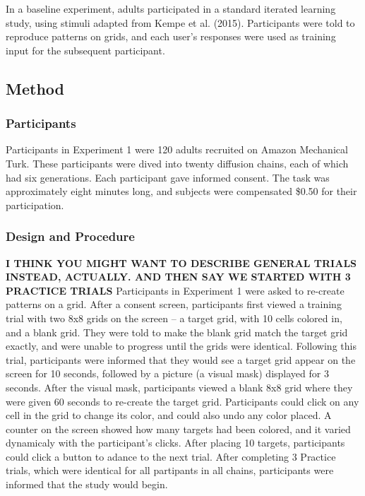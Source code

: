 \documentclass[10pt, letterpaper]{article}
\begin{document}
In a baseline experiment, adults participated in a standard iterated
learning study, using stimuli adapted from Kempe et al. (2015).
Participants were told to reproduce patterns on grids, and each user's
responses were used as training input for the subsequent participant.

\hypertarget{method}{%
\subsection{Method}\label{method}}

\hypertarget{participants}{%
\subsubsection{Participants}\label{participants}}

Participants in Experiment 1 were 120 adults recruited on Amazon
Mechanical Turk. These participants were dived into twenty diffusion
chains, each of which had six generations. Each participant gave
informed consent. The task was approximately eight minutes long, and
subjects were compensated \$0.50 for their participation.

\hypertarget{design-and-procedure}{%
\subsubsection{Design and Procedure}\label{design-and-procedure}}

\textbf{I THINK YOU MIGHT WANT TO DESCRIBE GENERAL TRIALS INSTEAD,
ACTUALLY. AND THEN SAY WE STARTED WITH 3 PRACTICE TRIALS} Participants
in Experiment 1 were asked to re-create patterns on a grid. After a
consent screen, participants first viewed a training trial with two 8x8
grids on the screen -- a target grid, with 10 cells colored in, and a
blank grid. They were told to make the blank grid match the target grid
exactly, and were unable to progress until the grids were identical.
Following this trial, participants were informed that they would see a
target grid appear on the screen for 10 seconds, followed by a picture
(a visual mask) displayed for 3 seconds. After the visual mask,
participants viewed a blank 8x8 grid where they were given 60 seconds to
re-create the target grid. Participants could click on any cell in the
grid to change its color, and could also undo any color placed. A
counter on the screen showed how many targets had been colored, and it
varied dynamicaly with the participant's clicks. After placing 10
targets, participants could click a button to adance to the next trial.
After completing 3 Practice trials, which were identical for all
partipants in all chains, participants were informed that the study
would begin.
\end{document}
